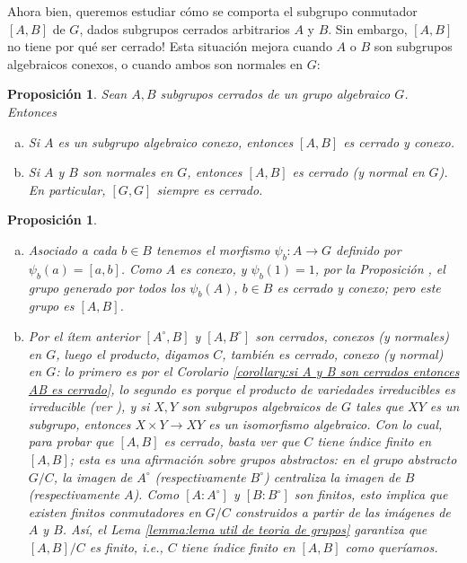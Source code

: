 \documentclass[spanish,10pt]{amsart}
\newtheorem{proposition}[theorem]{Proposición}
\theoremstyle{definition}
\theoremstyle{remark}
\numberwithin{equation}{section}
\begin{document}
Ahora bien, queremos estudiar cómo se comporta el subgrupo conmutador $[A,B]$ de $G$, dados subgrupos cerrados arbitrarios $A$ y $B$. Sin embargo, $[A,B]$ no tiene por qué ser cerrado!
Esta situación mejora cuando $A$ o $B$ son subgrupos algebraicos conexos, o cuando ambos son normales en $G$:

\begin{proposition}\label{proposition: el conmutador de conexo es conexo}
Sean $A,B$ subgrupos cerrados de un grupo algebraico $G$. Entonces
\begin{enumerate}[(a)]
\item Si $A$ es un subgrupo algebraico conexo, entonces $[A,B]$ es cerrado y conexo.
\item Si $A$ y $B$ son normales en $G$, entonces $[A,B]$ es cerrado (y normal en $G$). En particular, $[G,G]$ siempre es cerrado.
\end{enumerate}
\end{proposition}
\begin{proposition}
\begin{enumerate}[(a)]
\item Asociado a cada $b \in B$ tenemos el morfismo $\psi_b : A \to G$ definido por $\psi_b (a) = [a,b]$. Como $A$ es conexo, y $\psi_b (1) = 1$, por la Proposición \cite[7.5]{humphreys2012linearAlgebraicGroups}, el grupo generado por todos los $\psi_b (A)$, $b \in B$ es cerrado y conexo; pero este grupo es $[A,B]$.
\item Por el ítem anterior $[A^\circ, B]$ y $[A, B^\circ]$ son cerrados, conexos (y normales) en $G$, luego el producto, digamos $C$, también es cerrado, conexo (y normal) en $G$: lo primero es por el Corolario \ref{corollary:si A y B son cerrados entonces AB es cerrado}, lo segundo es porque el producto de variedades irreducibles es irreducible (ver \cite[Proposición 2.8.5]{notas_pedro}), y si $X,Y$ son subgrupos algebraicos de $G$ tales que $XY$ es un subgrupo, entonces $X \times Y \to XY$ es un isomorfismo algebraico. Con lo cual, para probar que $[A,B]$ es cerrado, basta ver que $C$ tiene índice finito en $[A,B]$; esta es una afirmación sobre grupos abstractos: en el grupo abstracto $G/C$, la imagen de $A^\circ$ (respectivamente $B^\circ$) centraliza la imagen de $B$ (respectivamente $A$). Como $[A : A^\circ]$ y $[B: B^\circ]$ son finitos, esto implica que existen finitos conmutadores en $G/C$ construidos a partir de las imágenes de $A$ y $B$. Así, el Lema \ref{lemma:lema util de teoria de grupos} garantiza que $[A,B]/C$ es finito, i.e., $C$ tiene índice finito en $[A,B]$ como queríamos.
\end{enumerate}
\end{proposition}
\end{document}
